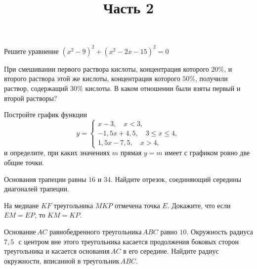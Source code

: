 \begin{training}[2]
\begin{listofex}
		\title{Часть 2}
		\item Решите уравнение \( (x^2-9)^2+(x^2-2x-15)^2=0 \)
		\item При смешивании первого раствора кислоты, концентрация которого \( 20\% \), и второго раствора этой же кислоты, концентрация которого \( 50\% \), получили раствор, содержащий \( 30\% \) кислоты. В каком отношении были взяты первый и второй растворы?
		\item Постройте график функции
		\[y= \left\{
		\begin{array}{l}
			x-3, \quad x<3,\\
			-1,5x+4,5,\quad 3\le x\le4,\\
			1,5x-7,5, \quad x>4,
		\end{array}
		\right.\]
		и определите, при каких значениях \( m \) прямая \( y=m \) имеет с графиком ровно две общие точки.
		\item Основания трапеции равны \( 16 \) и \( 34 \). Найдите отрезок, соединяющий середины диагоналей трапеции.
		\item На медиане \( KF \) треугольника \( MKP \) отмечена точка \( E \). Докажите, что если \( EM=EP \), то \( KM=KP \).
		\item Основание \( AC \) равнобедренного треугольника \( ABC \) равно \( 10 \). Окружность радиуса \( 7,5 \) \( \, \) с центром вне этого треугольника касается продолжения боковых сторон треугольника и касается основания \( AC \) в его середине. Найдите радиус окружности, вписанной в треугольник \( ABC \).
	\end{listofex}
\end{training}
